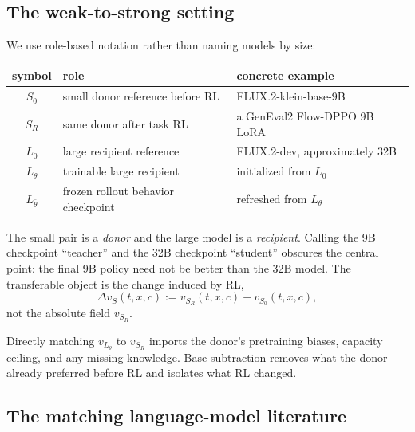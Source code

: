 \documentclass[11pt,a4paper]{article}
\newcommand{\Sbase}{S_0}
\newcommand{\Srl}{S_R}
\newcommand{\Lbase}{L_0}
\newcommand{\Lactor}{L_\theta}
\newcommand{\Lbeh}{L_{\bar\theta}}
\newcommand{\dvS}{\Delta v_S}
\theoremstyle{plain}
\theoremstyle{definition}
\begin{document}
\subsection{The weak-to-strong setting}

We use role-based notation rather than naming models by size:
\begin{center}
\begin{tabular}{@{}cll@{}}
\toprule
symbol & role & concrete example\\
\midrule
$\Sbase$ & small donor reference before RL & FLUX.2-klein-base-9B\\
$\Srl$ & same donor after task RL & a GenEval2 Flow-DPPO 9B LoRA\\
$\Lbase$ & large recipient reference & FLUX.2-dev, approximately 32B\\
$\Lactor$ & trainable large recipient & initialized from $\Lbase$\\
$\Lbeh$ & frozen rollout behavior checkpoint & refreshed from $\Lactor$\\
\bottomrule
\end{tabular}
\end{center}

The small pair is a \emph{donor} and the large model is a \emph{recipient}.  Calling the 9B
checkpoint ``teacher'' and the 32B checkpoint ``student'' obscures the central point: the final
9B policy need not be better than the 32B model.  The transferable object is the change induced
by RL,
\begin{equation}
\dvS(t,x,c)
:=
v_{\Srl}(t,x,c)-v_{\Sbase}(t,x,c),
\label{eq:velocity-shift}
\end{equation}
not the absolute field $v_{\Srl}$.

Directly matching $v_{\Lactor}$ to $v_{\Srl}$ imports the donor's pretraining biases, capacity
ceiling, and any missing knowledge.  Base subtraction removes what the donor already preferred
before RL and isolates what RL changed.

\subsection{The matching language-model literature}
\end{document}
